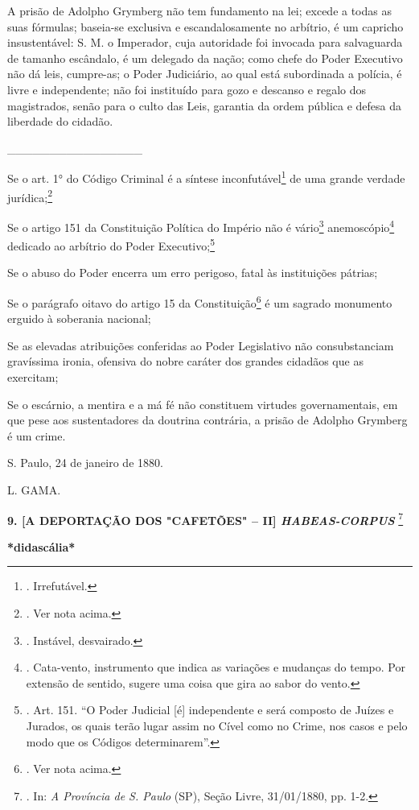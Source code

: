 A prisão de Adolpho Grymberg não tem fundamento na lei; excede a todas
as suas fórmulas; baseia-se exclusiva e escandalosamente no arbítrio, é
um capricho insustentável: S. M. o Imperador, cuja autoridade foi
invocada para salvaguarda de tamanho escândalo, é um delegado da nação;
como chefe do Poder Executivo não dá leis, cumpre-as; o Poder
Judiciário, ao qual está subordinada a polícia, é livre e independente;
não foi instituído para gozo e descanso e regalo dos magistrados, senão
para o culto das Leis, garantia da ordem pública e defesa da liberdade
do cidadão.

\_\_\_\_\_\_\_\_\_\_\_\_\_\_\_\_

Se o art. 1° do Código Criminal é a síntese inconfutável\footnote{.
  Irrefutável.} de uma grande verdade jurídica;\footnote{. Ver nota
  acima.}

Se o artigo 151 da Constituição Política do Império não é
vário\footnote{. Instável, desvairado.} anemoscópio\footnote{.
  Cata-vento, instrumento que indica as variações e mudanças do tempo.
  Por extensão de sentido, sugere uma coisa que gira ao sabor do vento.}
dedicado ao arbítrio do Poder Executivo;\footnote{. Art. 151. ``O Poder
  Judicial {[}é{]} independente e será composto de Juízes e Jurados, os
  quais terão lugar assim no Cível como no Crime, nos casos e pelo modo
  que os Códigos determinarem''.}

Se o abuso do Poder encerra um erro perigoso, fatal às instituições
pátrias;

Se o parágrafo oitavo do artigo 15 da Constituição\footnote{. Ver nota
  acima.} é um sagrado
monumento erguido à soberania nacional;

Se as elevadas atribuições conferidas ao Poder Legislativo não
consubstanciam gravíssima ironia, ofensiva do nobre caráter dos grandes
cidadãos que as exercitam;

Se o escárnio, a mentira e a má fé não constituem virtudes
governamentais, em que pese aos sustentadores da doutrina contrária, a
prisão de Adolpho Grymberg é um crime.

S. Paulo, 24 de janeiro de 1880.

L. GAMA.

\textbf{9. {[}A DEPORTAÇÃO DOS "CAFETÕES" -- II{]} \emph{HABEAS-CORPUS
}}\footnote{. In: \emph{A Província de S. Paulo} (SP), Seção Livre,
  31/01/1880, pp. 1-2.}

\textbf{*didascália*}

